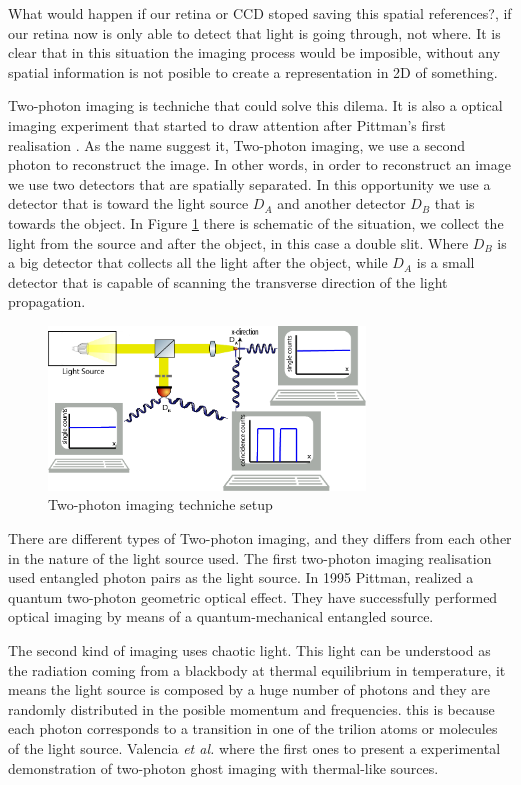 What would happen if our retina or CCD stoped saving this spatial references?, if our retina now is 
only able to detect that light is going through, not where. It is clear that in this situation 
the imaging process would be imposible, without any spatial information is not posible to create a representation in 2D of something.

Two-photon imaging is techniche that could solve this dilema. It is also a optical imaging experiment 
that started to draw attention after Pittman's first realisation \cite{pittman}. As the name suggest it, 
Two-photon imaging, we use a second photon to reconstruct the image. In other words, in order to reconstruct
an image we use two detectors that are spatially separated. In this opportunity we use a detector that
is toward the light source $D_A$ and another detector $D_B$ that is towards the object. In Figure
\ref{fig:twoPh} there is schematic of the situation, we collect the light from the source and after 
the object, in this case a double slit. Where $D_B$ is a big detector that collects all the light after the object, 
while $D_A$ is a small detector that is capable of scanning the transverse direction of the light propagation. 
\begin{figure}[h]
\centering
\includegraphics[width=0.75\textwidth]{Figures/twoPhotonSetup.png}
\caption{Two-photon imaging techniche setup} 
\label{fig:twoPh}
\end{figure}

There are different types of Two-photon imaging, and they differs from each other in the nature of the light 
source used. The first two-photon imaging realisation used entangled photon pairs as the light source. In 1995 Pittman, realized a 
quantum two-photon geometric optical effect.  They have successfully performed optical 
imaging by means of a quantum-mechanical entangled source\cite{pittman}.

The second kind of imaging uses chaotic light. This light can be understood as the radiation coming from
a blackbody at thermal equilibrium in temperature, it means the light source is composed by 
a huge number of photons and they are randomly distributed in the posible momentum and frequencies.
this is because each photon corresponds to a transition in one of the trilion atoms or molecules of the light source.
Valencia \textit{et al.} where the first ones to present a experimental demonstration 
of two-photon ghost imaging with thermal-like sources\cite{thermalAlejandra}.

